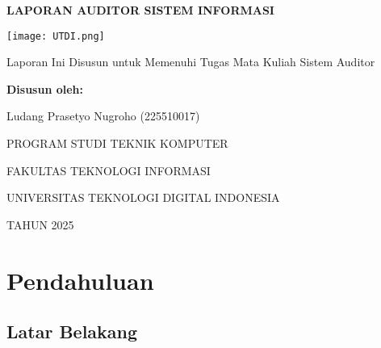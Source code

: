 \documentclass[12pt, a4paper]{report}
\begin{document}

\begin{titlepage}
    \centering
    
    {\fontsize{16}{18}\bfseries
    LAPORAN AUDITOR SISTEM INFORMASI\par
    }
    
    \vspace{1.5cm}
    
    \texttt{[image: UTDI.png]}
      
    \vspace{1.5cm}
    
    {\large
    Laporan Ini Disusun untuk Memenuhi Tugas Mata Kuliah Sistem Auditor\par
    }
    
    \vspace{3cm}
    
    {\bfseries
    Disusun oleh:\par
    Ludang Prasetyo Nugroho (225510017)\par
    }
    
    \vfill %
    
    {\large
    PROGRAM STUDI TEKNIK KOMPUTER \par
    FAKULTAS TEKNOLOGI INFORMASI \par
    UNIVERSITAS TEKNOLOGI DIGITAL INDONESIA \par
    TAHUN 2025 \par
    }
\end{titlepage}

\tableofcontents
\newpage

\onehalfspacing

\setcounter{page}{1}

\chapter{Pendahuluan}
\label{bab:pendahuluan}

\section{Latar Belakang}
\end{document}
